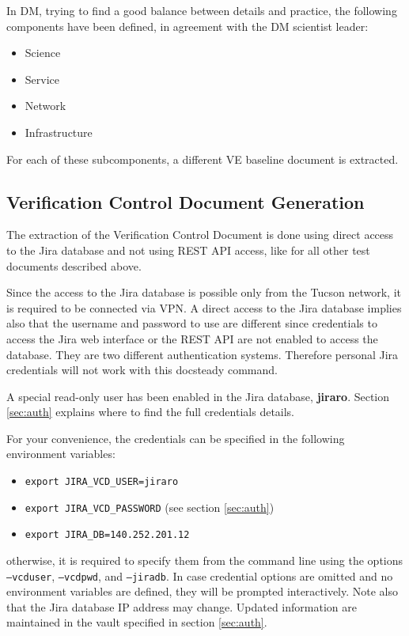 \documentclass[DM]{lsstdoc}
\begin{document}
In DM, trying to find a good balance between details and practice, the following components have been defined, in agreement with the DM scientist leader:

\begin{itemize}
\item Science
\item Service
\item Network
\item Infrastructure
\end{itemize}

For each of these subcomponents, a different VE baseline document is extracted.



\subsection{Verification Control Document Generation}

The extraction of the Verification Control Document is done using direct access to the Jira database and not using REST API access, like for all other test documents described above.

Since the access to the Jira database is possible only from the Tucson network, it is required to be connected via VPN.
A direct access to the Jira database implies also that the username and password to use are different since credentials to access the Jira web interface or the REST API are not enabled to access the database. They are two different authentication systems.
Therefore personal Jira credentials will not work with this docsteady command.

A special read-only user has been enabled in the Jira database, \textbf{jiraro}.
Section \ref{sec:auth} explains where to find the full credentials details.

For your convenience, the credentials can be specified in the following environment variables:

\begin{itemize}
\item \texttt{export JIRA\_VCD\_USER=jiraro}
\item \texttt{export JIRA\_VCD\_PASSWORD} (see section \ref{sec:auth})
\item \texttt{export JIRA\_DB=140.252.201.12}
\end{itemize}

otherwise, it is required to specify them from the command line using the options \texttt{--vcduser}, \texttt{--vcdpwd}, and \texttt{--jiradb}.
In case credential options are omitted and no environment variables are defined, they will be prompted interactively.
Note also that the Jira database IP address may change. Updated information are maintained in the vault specified in section \ref{sec:auth}.
\end{document}
